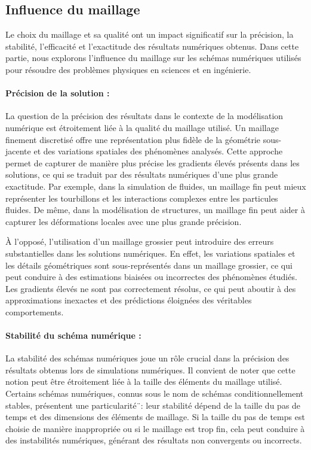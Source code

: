 \subsection{Influence du maillage}

Le choix du maillage et sa qualité ont un impact significatif sur la précision, la stabilité, l'efficacité et l'exactitude des résultats numériques obtenus. Dans cette partie, nous explorons l'influence du maillage sur les schémas numériques utilisés pour résoudre des problèmes physiques en sciences et en ingénierie.

\paragraph{Précision de la solution :}

La question de la précision des résultats dans le contexte de la modélisation numérique est étroitement liée à la qualité du maillage utilisé. Un maillage finement discretisé offre une représentation plus fidèle de la géométrie sous-jacente et des variations spatiales des phénomènes analysés. Cette approche permet de capturer de manière plus précise les gradients élevés présents dans les solutions, ce qui se traduit par des résultats numériques d'une plus grande exactitude. Par exemple, dans la simulation de fluides, un maillage fin peut mieux représenter les tourbillons et les interactions complexes entre les particules fluides. De même, dans la modélisation de structures, un maillage fin peut aider à capturer les déformations locales avec une plus grande précision.

À l'opposé, l'utilisation d'un maillage grossier peut introduire des erreurs substantielles dans les solutions numériques. En effet, les variations spatiales et les détails géométriques sont sous-représentés dans un maillage grossier, ce qui peut conduire à des estimations biaisées ou incorrectes des phénomènes étudiés. Les gradients élevés ne sont pas correctement résolus, ce qui peut aboutir à des approximations inexactes et des prédictions éloignées des véritables comportements.

\paragraph{Stabilité du schéma numérique :}

La stabilité des schémas numériques joue un rôle crucial dans la précision des résultats obtenus lors de simulations numériques. Il convient de noter que cette notion peut être étroitement liée à la taille des éléments du maillage utilisé. Certains schémas numériques, connus sous le nom de schémas conditionnellement stables, présentent une particularité¨: leur stabilité dépend de la taille du pas de temps et des dimensions des éléments de maillage. Si la taille du pas de temps est choisie de manière inappropriée ou si le maillage est trop fin, cela peut conduire à des instabilités numériques, générant des résultats non convergents ou incorrects.

